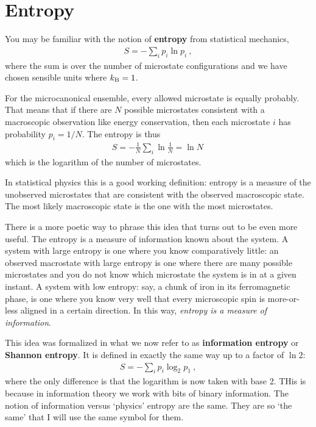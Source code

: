 \chapter{Entropy} 

  You may be familiar with the notion of \textbf{entropy} from statistical mechanics,
  \begin{align}
    S = -\sum_i p_i \ln p_i \ ,
  \end{align}
  where the sum is over the number of microstate configurations and we have chosen sensible units where $k_\textnormal{B} =1$. 
  \begin{example}
  For the microcanonical ensemble, every allowed microstate is equally probably. That means that if there are $N$ possible microstates consistent with a macroscopic observation like energy conservation, then each microstate $i$ has probability $p_i = 1/N$. The entropy is thus
  \begin{align}
    S = -\frac{1}{N}\sum_i \ln \frac{1}{N} = \ln N \,
  \end{align}
  which is the logarithm of the number of microstates.
  \end{example}
  In statistical physics this is a good working definition: entropy is a measure of the unobserved microstates that are consistent with the observed macroscopic state. The most likely macroscopic state is the one with the most microstates. 

  There is a more poetic way to phrase this idea that turns out to be even more useful. The entropy is a measure of information known about the system. A system with large entropy is one where you know comparatively little: an observed macrostate with large entropy is one where there are many possible microstates and you do not know which microstate the system is in at a given instant. A system with low entropy: say, a chunk of iron in its ferromagnetic phase, is one where you know very well that every microscopic spin is more-or-less aligned in a certain direction. In this way, \emph{entropy is a measure of information}.

  This idea was formalized in what we now refer to as \textbf{information entropy} or \textbf{Shannon entropy}. It is defined in exactly the same way up to a factor of $\ln 2$:
  \begin{align}
    S = -\sum_i p_i \log_2 p_1 \ ,
  \end{align}
  where the only difference is that the logarithm is now taken with base 2. THis is because in information theory we work with bits of binary information. The notion of information versus `physics' entropy are the same. They are so `the same' that I will use the same symbol for them. 


